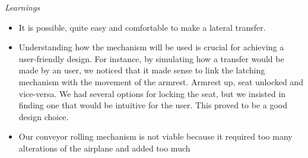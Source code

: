 \emph{Learnings}

\begin{itemize}
	\item It is possible, quite easy and comfortable to make a lateral transfer.
	\item Understanding how the mechanism will be used is crucial for achieving a user-friendly design. For instance, by simulating how a transfer would be made by an user, we noticed that it made sense to link the latching mechanism with the movement of the armrest. Armrest up, seat unlocked and vice-versa. We had several options for locking the seat, but we insisted in finding one that would be intuitive for the user. This proved to be a good design choice.
	\item Our conveyor rolling mechanism is not viable because it required too many alterations of the airplane and added too much 
\end{itemize}


